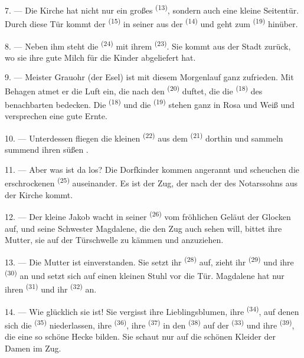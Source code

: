7. --- Die Kirche hat nicht nur ein großes  \textsuperscript{(13)},
sondern auch eine kleine Seitentür. Durch diese Tür kommt der 
\textsuperscript{(15)} in seiner  aus der 
\textsuperscript{(14)} und geht zum  \textsuperscript{(19)} hinüber.

8. --- Neben ihm steht die  \textsuperscript{(24)} mit ihrem
 \textsuperscript{(23)}. Sie kommt aus der Stadt zurück, wo sie ihre
gute Milch für die Kinder abgeliefert hat.

\VUsaut{4.0mm}
\VUsaut{3.4mm}

9. --- Meister Grauohr (der Esel) ist mit diesem Morgenlauf ganz zufrieden. Mit
Behagen atmet er die Luft ein, die nach den  \textsuperscript{(20)}
duftet, die die  \textsuperscript{(18)} des benachbarten
 bedecken. Die  \textsuperscript{(18)} und
die  \textsuperscript{(19)} stehen ganz in Rosa und Weiß und
versprechen eine gute Ernte.

10. --- Unterdessen fliegen die kleinen  \textsuperscript{(22)} aus dem
 \textsuperscript{(21)} dorthin und sammeln summend ihren süßen
.

11. --- Aber was ist da los? Die Dorfkinder kommen angerannt und scheuchen die
erschrockenen  \textsuperscript{(25)} auseinander. Es ist der Zug, der
nach der  des Notarssohns aus der Kirche kommt.

12. --- Der kleine Jakob wacht in seiner  \textsuperscript{(26)} vom
fröhlichen Geläut der Glocken auf, und seine Schwester Magdalene, die den Zug
auch sehen will, bittet ihre Mutter, sie auf der Türschwelle zu kämmen und
anzuziehen.

13. --- Die Mutter ist einverstanden. Sie setzt ihr 
\textsuperscript{(28)} auf, zieht ihr  \textsuperscript{(29)} und ihre
 \textsuperscript{(30)} an und setzt sich auf einen kleinen Stuhl vor
die Tür. Magdalene hat nur ihren  \textsuperscript{(31)} und ihr
 \textsuperscript{(32)} an.

14. --- Wie glücklich sie ist! Sie vergisst ihre Lieblingsblumen, ihre
 \textsuperscript{(34)}, auf denen sich die 
\textsuperscript{(35)} niederlassen, ihre  \textsuperscript{(36)}, ihre
 \textsuperscript{(37)} in den 
\textsuperscript{(38)} auf der  \textsuperscript{(33)} und ihre
 \textsuperscript{(39)}, die eine so schöne Hecke bilden. Sie schaut
nur auf die schönen Kleider der Damen im Zug.

